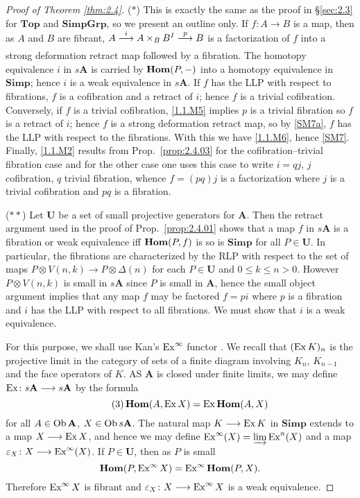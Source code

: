 \documentclass[../main]{subfiles}
\begin{document}
\begin{proof}[Proof of Theorem \ref{thm:2.4}]
($\ast$) This is exactly the same as the proof in \S\ref{sec:2.3} for $\mathbf{Top}$ and $\mathbf{SimpGrp}$, so we present an outline only. If $f \colon A \longrightarrow B$ is a map, then as $A$ and $B$ are fibrant, $A \varrightarrow i A \times_B B^I \varrightarrow p B$ is a factorization of $f$ into a strong deformation retract map followed by a fibration. The homotopy equivalence $i$ in $s \mathbf{A}$ is carried by $\operatorname{\mathbf{Hom}}(P, -)$ into a homotopy equivalence in $\mathbf{Simp}$; hence $i$ is a weak equivalence in $s\mathbf{A}$. If $f$ has the LLP with respect to fibrations, $f$ is a cofibration and a retract of $i$; hence $f$ is a trivial cofibration. Conversely, if $f$ is a trivial cofibration, \ref{1.1.M5} implies $p$ is a trivial fibration so $f$ is a retract of $i$; hence $f$ is a strong deformation retract map, so by \ref{SM7a}, $f$ has the LLP with respect to the fibrations. With this we have \ref{1.1.M6}, hence \ref{SM7}. Finally, \ref{1.1.M2} results from Prop.\ \ref{prop:2.4.03} for the cofibration--trivial fibration case and for the other case one uses this case to write $i = qj$, $j$ cofibration, $q$ trivial fibration, whence $f = (pq)j$ is a factorization where $j$ is a trivial cofibration and $pq$ is a fibration.

($\ast\ast$) Let $\mathbf{U}$ be a set of small projective generators for $\mathbf{A}$. Then the retract argument used in the proof of Prop.\ \ref{prop:2.4.01} shows that a map $f$ in $s\mathbf{A}$ is a fibration or weak equivalence iff $\operatorname{\mathbf{Hom}}(P, f)$ is so is $\mathbf{Simp}$ for all $P \in \mathbf{U}$. In particular, the fibrations are characterized by the RLP with respect to the set of maps $P \otimes V(n, k) \longrightarrow P \otimes \Delta(n)$ for each $P \in \mathbf{U}$ and $0 \leq k \leq n >0$. However $P \otimes V(n, k)$ is small in $s \mathbf{A}$  since $P$ is small in $\mathbf{A}$, hence the small object argument implies that any map $f$ may be factored $f = pi$ where $p$ is a fibration and $i$ has the LLP with respect to all fibrations. We must show that $i$ is a weak equivalence. 

For this purpose, we shall use Kan's $\operatorname{Ex}^\infty$ functor \cite{kan_css_1957}. We recall that $(\operatorname{Ex} K)_n$ is the projective limit in the category of sets of a finite diagram involving $K_n$, $K_{n-1}$ and the face operators of $K$. AS $\mathbf{A}$ is closed under finite limits, we may define $\operatorname{Ex} \colon s \mathbf{A} \longrightarrow s \mathbf{A}$ by the formula 
\begin{equation}\tag{3}
\label{eq:2.4.3}
    \operatorname{\mathbf{Hom}}(A, \operatorname{Ex} X) = \operatorname{Ex} \operatorname{\mathbf{Hom}}(A, X)
\end{equation}
for all $A \in \operatorname{Ob} \mathbf{A}$, $X \in \operatorname{Ob} s \mathbf{A}$. The natural map $K \longrightarrow \operatorname{Ex} K$ in $\mathbf{Simp}$ extends to a map $X \longrightarrow \operatorname{Ex} X$, and hence we may define $\operatorname{Ex}^\infty(X) = \varinjlim \operatorname{Ex}^n(X)$ and a map $\varepsilon_X \colon X \longrightarrow \operatorname{Ex}^\infty(X)$. If $P \in \mathbf{U}$, then as $P$ is small
\[\operatorname{\mathbf{Hom}}(P, \operatorname{Ex}^\infty X) = \operatorname{Ex}^\infty \operatorname{\mathbf{Hom}}(P,X).\] Therefore $\operatorname{Ex}^\infty X$ is fibrant and $\varepsilon_X \colon X \longrightarrow \operatorname{Ex}^\infty X$ is a weak equivalence.


\end{proof}
\end{document}
